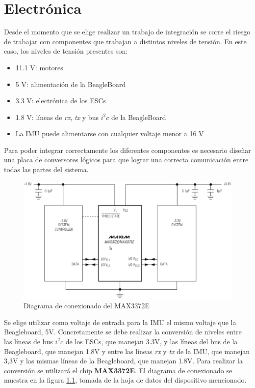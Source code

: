\documentclass[main]{subfiles}
\begin{document}
\chapter{Electrónica}

Desde el momento que se elige realizar un trabajo de integración se corre el riesgo de trabajar con componentes que trabajan a distintos niveles de tensión. En este caso, los niveles de tensión presentes son:
\begin{itemize}
\item 11.1 V: motores
\item 5 V: alimentación de la BeagleBoard
\item 3.3 V: electrónica de los ESCs
\item 1.8 V: líneas de \emph{rx}, \emph{tx} y bus $i^2c$ de la BeagleBoard
\item La IMU puede alimentarse con cualquier voltaje menor a 16 V
\end{itemize}

Para poder integrar correctamente los diferentes componentes es necesario diseñar una placa de conversores lógicos para que lograr una correcta comunicación entre todas las partes del sistema.\\

\begin{figure}[h!]
	\centering
	\vspace{-10pt}
	\includegraphics[width=.65\textwidth]{./pics_electronica/max.png}
	\vspace{-10pt}	
	\caption{Diagrama de conexionado del MAX3372E}
	\label{fig:max}
\end{figure}

Se elige utilizar como voltaje de entrada para la IMU el mismo voltaje que la Beagleboard, 5V.
Concretamente se debe realizar la conversión de niveles entre las líneas de bus $i^2c$ de los ESCs, que manejan 3.3V, y las líneas del bus de la Beagleboard, que manejan 1.8V y entre las líneas \emph{rx} y \emph{tx} de la IMU, que manejan 3,3V y las mismas líneas de la Beagleboard, que manejan 1.8V. Para realizar la conversión se utilizará el chip \textbf{MAX3372E}. El diagrama de conexionado se muestra en la figura \ref{fig:max}, tomada de la hoja de datos del dispositivo mencionado.
\end{document}
